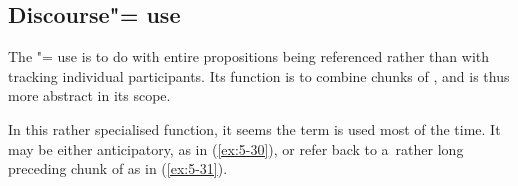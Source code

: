 \subsection{Discourse"= use}
\label{subsec:5-2-5}

The "= use is to do with entire propositions being referenced rather than with tracking individual  participants. Its function is to combine chunks of  \citep[432]{diessel2006}, and is thus more abstract in its scope.



In this rather specialised function, it seems the  term is used most of the time. It may be either anticipatory, as in (\ref{ex:5-30}), or refer back to a~rather long preceding chunk of  as in (\ref{ex:5-31}).

